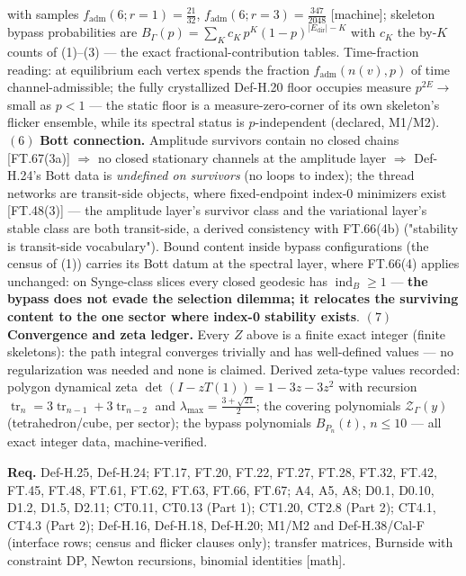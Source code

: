 \begin{theorem}
with samples $f_{\mathrm{adm}}(6;r{=}1)=\tfrac{21}{32}$, $f_{\mathrm{adm}}(6;r{=}3)=\tfrac{347}{2048}$ [machine]; skeleton bypass probabilities are $B_\Gamma(p)=\sum_Kc_K\,p^K(1-p)^{|E_{\mathrm{dir}}|-K}$ with $c_K$ the by-$K$ counts of (1)–(3) — the exact fractional-contribution tables. Time-fraction reading: at equilibrium each vertex spends the fraction $f_{\mathrm{adm}}(n(v),p)$ of time channel-admissible; the fully crystallized Def-H.20 floor occupies measure $p^{2E}\to$ small as $p<1$ — the static floor is a measure-zero-corner of its own skeleton's flicker ensemble, while its spectral status is $p$-independent (declared, M1/M2). $(6)$ \textbf{Bott connection.} Amplitude survivors contain no closed chains [FT.67(3a)] $\Rightarrow$ no closed stationary channels at the amplitude layer $\Rightarrow$ Def-H.24's Bott data is \textit{undefined on survivors} (no loops to index); the thread networks are transit-side objects, where fixed-endpoint index-0 minimizers exist [FT.48(3)] — the amplitude layer's survivor class and the variational layer's stable class are both transit-side, a derived consistency with FT.66(4b) ("stability is transit-side vocabulary"). Bound content inside bypass configurations (the census of (1)) carries its Bott datum at the spectral layer, where FT.66(4) applies unchanged: on Synge-class slices every closed geodesic has $\operatorname{ind}_B\ge1$ — \textbf{the bypass does not evade the selection dilemma; it relocates the surviving content to the one sector where index-0 stability exists}. $(7)$ \textbf{Convergence and zeta ledger.} Every $Z$ above is a finite exact integer (finite skeletons): the path integral converges trivially and has well-defined values — no regularization was needed and none is claimed. Derived zeta-type values recorded: polygon dynamical zeta $\det(I-zT(1))=1-3z-3z^2$ with recursion $\operatorname{tr}_n=3\operatorname{tr}_{n-1}+3\operatorname{tr}_{n-2}$ and $\lambda_{\max}=\tfrac{3+\sqrt{21}}2$; the covering polynomials $\mathcal Z_\Gamma(y)$ (tetrahedron/cube, per sector); the bypass polynomials $B_{P_n}(t)$, $n\le10$ — all exact integer data, machine-verified.

\textbf{Req.} Def-H.25, Def-H.24; FT.17, FT.20, FT.22, FT.27, FT.28, FT.32, FT.42, FT.45, FT.48, FT.61, FT.62, FT.63, FT.66, FT.67; A4, A5, A8; D0.1, D0.10, D1.2, D1.5, D2.11; CT0.11, CT0.13 (Part 1); CT1.20, CT2.8 (Part 2); CT4.1, CT4.3 (Part 2); Def-H.16, Def-H.18, Def-H.20; M1/M2 and Def-H.38/Cal-F (interface rows; census and flicker clauses only); transfer matrices, Burnside with constraint DP, Newton recursions, binomial identities [math].


\end{theorem}
